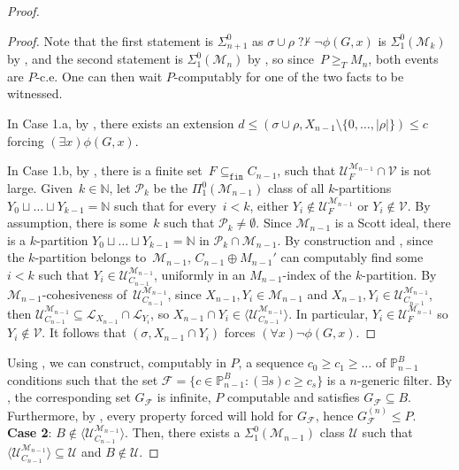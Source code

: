 \documentclass{article}
\def\NN{\mathbb{N}}
\def\PP{\mathbb{P}}
\def\F{\mathcal{F}}
\def\U{\mathcal{U}}
\def\V{\mathcal{V}}
\def\P{\mathcal{P}}
\def\M{\mathcal{M}}
\def\PP{\mathbb{P}}
\renewcommand{\L}[0]{\mathcal{L}}
\newcommand{\nqvdash}{\operatorname{{?}{\nvdash}}}
\newcommand{\finsub}{\subseteq_{\mathtt{fin}}}
\numberwithin{theorem}{section}
\theoremstyle{definition}
\begin{document}
\begin{proof}
\begin{proof}
Note that the first statement is $\Sigma^0_{n+1}$ as $\sigma \cup \rho \nqvdash \neg \phi(G,x)$ is $\Sigma^0_1(\M_k)$ by , and the second statement is $\Sigma^0_1(\M_n)$ by , so since~$P \geq_T M_n$, both events are $P$-c.e. One can then wait $P$-computably for one of the two facts to be witnessed.

In Case 1.a, by , there exists an extension $d \leq (\sigma \cup \rho, X_{n-1} \setminus \{0,\dots,|\rho|\}) \leq c$ forcing $(\exists x)\phi(G,x)$.

In Case 1.b, by , there is a finite set~$F \finsub C_{n-1}$, such that $\U_{F}^{\M_{n-1}} \cap \V$ is not large. Given~$k \in \NN$, let $\P_k$ be the $\Pi^0_1(\M_{n-1})$ class of all $k$-partitions $Y_0 \sqcup \dots \sqcup Y_{k-1} = \NN$ such that for every~$i < k$, either $Y_i \not \in \U_F^{\M_{n-1}}$ or $Y_i \not \in \V$. By assumption, there is some~$k$ such that $\P_k \neq \emptyset$. Since $\M_{n-1}$ is a Scott ideal, there is a $k$-partition $Y_0 \sqcup \dots \sqcup Y_{k-1} = \NN$ in $\P_k \cap \M_{n-1}$. By construction and  , since the $k$-partition belongs to~$\M_{n-1}$, $C_{n-1}\oplus M_{n-1}'$ can computably find some~$i < k$ such that $Y_i \in \U^{\M_{n-1}}_{C_{n-1}}$, uniformly in an $M_{n-1}$-index of the $k$-partition. By $\M_{n-1}$-cohesiveness of~$\U^{\M_{n-1}}_{C_{n-1}}$, since $X_{n-1},Y_i \in \M_{n-1}$ and $X_{n-1}, Y_i \in \U^{\M_{n-1}}_{C_{n-1}}$, then $\U^{\M_{n-1}}_{C_{n-1}} \subseteq \L_{X_{n-1}} \cap \L_{Y_i}$, so $X_{n-1} \cap Y_i \in \langle \U^{\M_{n-1}}_{C_{n-1}} \rangle$. In particular, $Y_i \in \U^{\M_{n-1}}_F$ so $Y_i \not \in \V$. It follows that $(\sigma, X_{n-1} \cap Y_i)$ forces $(\forall x) \neg\phi(G,x)$.
\end{proof}

Using , we can construct, computably in $P$, a sequence $c_0 \geq c_1 \geq \dots$ of $\PP^B_{n-1}$ conditions such that the set $\F = \{c \in \PP^B_{n-1} : (\exists s) c \geq c_s \}$ is a $n$-generic filter. By , the corresponding set $G_{\F}$ is infinite, $P$ computable and satisfies $G_{\F} \subseteq B$. Furthermore, by , every property forced will hold for $G_{\F}$, hence $G_{\F}^{(n)} \leq P$.  \\

\textbf{Case 2}: $B \notin \langle \U_{C_{n-1}}^{\M_{n-1}} \rangle$. Then, there exists a $\Sigma_1^0(\M_{n-1})$ class $\U$ such that $\langle \U_{C_{n-1}}^{\M_{n-1}} \rangle \subseteq \U$ and $B \notin \U$. 


\end{proof}
\end{document}
